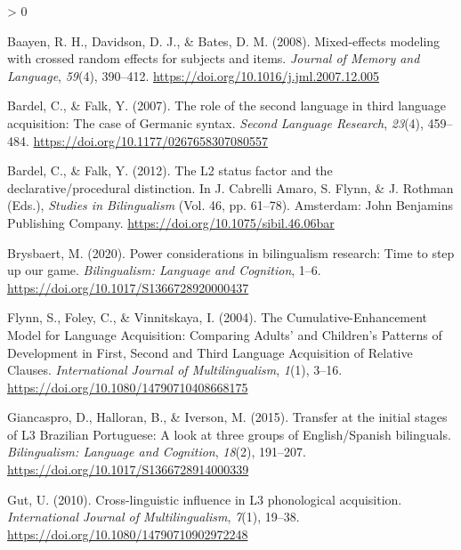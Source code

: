 \documentclass[
  english,
  man]{apa6}
\newlength{\cslhangindent}
\newenvironment{CSLReferences}[2] %
 {%
  \setlength{\parindent}{0pt}
  \ifodd #1 \everypar{\setlength{\hangindent}{\cslhangindent}}\ignorespaces\fi
  \ifnum #2 > 0
  \setlength{\parskip}{#2\baselineskip}
  \fi
 }%
 {}
\begin{document}
\hypertarget{refs}{}
\begin{CSLReferences}{1}{0}
\leavevmode\hypertarget{ref-baayen_mixed-effects_2008}{}%
Baayen, R. H., Davidson, D. J., \& Bates, D. M. (2008). Mixed-effects modeling with crossed random effects for subjects and items. \emph{Journal of Memory and Language}, \emph{59}(4), 390--412. \url{https://doi.org/10.1016/j.jml.2007.12.005}

\leavevmode\hypertarget{ref-bardel_role_2007}{}%
Bardel, C., \& Falk, Y. (2007). The role of the second language in third language acquisition: The case of {Germanic} syntax. \emph{Second Language Research}, \emph{23}(4), 459--484. \url{https://doi.org/10.1177/0267658307080557}

\leavevmode\hypertarget{ref-cabrelli_amaro_l2_2012}{}%
Bardel, C., \& Falk, Y. (2012). The {L2} status factor and the declarative/procedural distinction. In J. Cabrelli Amaro, S. Flynn, \& J. Rothman (Eds.), \emph{Studies in {Bilingualism}} (Vol. 46, pp. 61--78). Amsterdam: John Benjamins Publishing Company. \url{https://doi.org/10.1075/sibil.46.06bar}

\leavevmode\hypertarget{ref-brysbaert_power_2020}{}%
Brysbaert, M. (2020). Power considerations in bilingualism research: {Time} to step up our game. \emph{Bilingualism: Language and Cognition}, 1--6. \url{https://doi.org/10.1017/S1366728920000437}

\leavevmode\hypertarget{ref-flynn_cumulative-enhancement_2004}{}%
Flynn, S., Foley, C., \& Vinnitskaya, I. (2004). The {Cumulative}-{Enhancement} {Model} for {Language} {Acquisition}: {Comparing} {Adults}' and {Children}'s {Patterns} of {Development} in {First}, {Second} and {Third} {Language} {Acquisition} of {Relative} {Clauses}. \emph{International Journal of Multilingualism}, \emph{1}(1), 3--16. \url{https://doi.org/10.1080/14790710408668175}

\leavevmode\hypertarget{ref-giancaspro_transfer_2015}{}%
Giancaspro, D., Halloran, B., \& Iverson, M. (2015). Transfer at the initial stages of {L3} {Brazilian} {Portuguese}: {A} look at three groups of {English}/{Spanish} bilinguals. \emph{Bilingualism: Language and Cognition}, \emph{18}(2), 191--207. \url{https://doi.org/10.1017/S1366728914000339}

\leavevmode\hypertarget{ref-gut_cross-linguistic_2010}{}%
Gut, U. (2010). Cross-linguistic influence in {L3} phonological acquisition. \emph{International Journal of Multilingualism}, \emph{7}(1), 19--38. \url{https://doi.org/10.1080/14790710902972248}


\end{CSLReferences}
\end{document}
